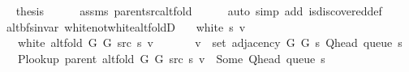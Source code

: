 \begin{isabellebody}
\ \ \isamarkupfalse%
\ {\isacharquery}{\kern0pt}thesis\isanewline
\ \ \ \ \isamarkupfalse%
\ assms{\isacharparenleft}{\kern0pt}{}{\isacharparenright}{\kern0pt}\ parent{\isacharunderscore}{\kern0pt}src{\isacharunderscore}{\kern0pt}alt{\isacharunderscore}{\kern0pt}fold\isanewline
\ \ \ \ \isamarkupfalse%
\ {\isacharparenleft}{\kern0pt}auto\ simp\ add{\isacharcolon}{\kern0pt}\ is{\isacharunderscore}{\kern0pt}discovered{\isacharunderscore}{\kern0pt}def{\isacharparenright}{\kern0pt}\isanewline
{}\isamarkupfalse%
%
\endisatagproof
{\isafoldproof}%
%
\isadelimproof
\isanewline
%
\endisadelimproof
%
\isadeliminvisible
\isanewline
%
\endisadeliminvisible
%
\isataginvisible
{}\isamarkupfalse%
\ {\isacharparenleft}{\kern0pt}\ alt{\isacharunderscore}{\kern0pt}bfs{\isacharunderscore}{\kern0pt}invar{\isacharparenright}{\kern0pt}\ white{\isacharunderscore}{\kern0pt}not{\isacharunderscore}{\kern0pt}white{\isacharunderscore}{\kern0pt}alt{\isacharunderscore}{\kern0pt}foldD{\isacharcolon}{\kern0pt}\isanewline
\ \ \ {\isachardoublequoteopen}white\ s\ v{\isachardoublequoteclose}\isanewline
\ \ \ {\isachardoublequoteopen}{\isasymnot}\ white\ {\isacharparenleft}{\kern0pt}alt{\isacharunderscore}{\kern0pt}fold\ G{}\ G{}\ src\ s{\isacharparenright}{\kern0pt}\ v{\isachardoublequoteclose}\isanewline
\ \ \isanewline
\ \ \ \ {\isachardoublequoteopen}v\ {\isasymin}\ set\ {\isacharparenleft}{\kern0pt}adjacency\ G{}\ G{}\ s\ {\isacharparenleft}{\kern0pt}Q{\isacharunderscore}{\kern0pt}head\ {\isacharparenleft}{\kern0pt}queue\ s{\isacharparenright}{\kern0pt}{\isacharparenright}{\kern0pt}{\isacharparenright}{\kern0pt}{\isachardoublequoteclose}\isanewline
\ \ \ \ {\isachardoublequoteopen}P{\isacharunderscore}{\kern0pt}lookup\ {\isacharparenleft}{\kern0pt}parent\ {\isacharparenleft}{\kern0pt}alt{\isacharunderscore}{\kern0pt}fold\ G{}\ G{}\ src\ s{\isacharparenright}{\kern0pt}{\isacharparenright}{\kern0pt}\ v\ {\isacharequal}{\kern0pt}\ Some\ {\isacharparenleft}{\kern0pt}Q{\isacharunderscore}{\kern0pt}head\ {\isacharparenleft}{\kern0pt}queue\ s{\isacharparenright}{\kern0pt}{\isacharparenright}{\kern0pt}{\isachardoublequoteclose}%
\endisataginvisible
{\isafoldinvisible}%
%
\isadeliminvisible
\isanewline
%
\endisadeliminvisible
%
\isadelimproof
%
\endisadelimproof
%
\isatagproof
{}\isamarkupfalse%
\ {\isacharminus}{\kern0pt}\isanewline
\ \ \isamarkupfalse%

\end{isabellebody}
